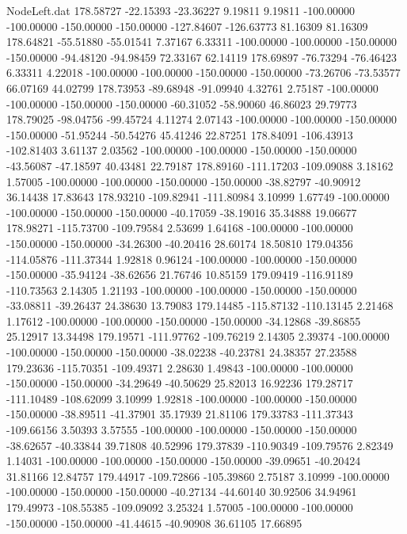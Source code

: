 \begin{filecontents}{NodeLeft.dat}
 178.58727  -22.15393  -23.36227     9.19811    9.19811 -100.00000 -100.00000 -150.00000 -150.00000 -127.84607 -126.63773   81.16309   81.16309
 178.64821  -55.51880  -55.01541     7.37167    6.33311 -100.00000 -100.00000 -150.00000 -150.00000  -94.48120  -94.98459   72.33167   62.14119
 178.69897  -76.73294  -76.46423     6.33311    4.22018 -100.00000 -100.00000 -150.00000 -150.00000  -73.26706  -73.53577   66.07169   44.02799
 178.73953  -89.68948  -91.09940     4.32761    2.75187 -100.00000 -100.00000 -150.00000 -150.00000  -60.31052  -58.90060   46.86023   29.79773
 178.79025  -98.04756  -99.45724     4.11274    2.07143 -100.00000 -100.00000 -150.00000 -150.00000  -51.95244  -50.54276   45.41246   22.87251
 178.84091 -106.43913 -102.81403     3.61137    2.03562 -100.00000 -100.00000 -150.00000 -150.00000  -43.56087  -47.18597   40.43481   22.79187
 178.89160 -111.17203 -109.09088     3.18162    1.57005 -100.00000 -100.00000 -150.00000 -150.00000  -38.82797  -40.90912   36.14438   17.83643
 178.93210 -109.82941 -111.80984     3.10999    1.67749 -100.00000 -100.00000 -150.00000 -150.00000  -40.17059  -38.19016   35.34888   19.06677
 178.98271 -115.73700 -109.79584     2.53699    1.64168 -100.00000 -100.00000 -150.00000 -150.00000  -34.26300  -40.20416   28.60174   18.50810
 179.04356 -114.05876 -111.37344     1.92818    0.96124 -100.00000 -100.00000 -150.00000 -150.00000  -35.94124  -38.62656   21.76746   10.85159
 179.09419 -116.91189 -110.73563     2.14305    1.21193 -100.00000 -100.00000 -150.00000 -150.00000  -33.08811  -39.26437   24.38630   13.79083
 179.14485 -115.87132 -110.13145     2.21468    1.17612 -100.00000 -100.00000 -150.00000 -150.00000  -34.12868  -39.86855   25.12917   13.34498
 179.19571 -111.97762 -109.76219     2.14305    2.39374 -100.00000 -100.00000 -150.00000 -150.00000  -38.02238  -40.23781   24.38357   27.23588
 179.23636 -115.70351 -109.49371     2.28630    1.49843 -100.00000 -100.00000 -150.00000 -150.00000  -34.29649  -40.50629   25.82013   16.92236
 179.28717 -111.10489 -108.62099     3.10999    1.92818 -100.00000 -100.00000 -150.00000 -150.00000  -38.89511  -41.37901   35.17939   21.81106
 179.33783 -111.37343 -109.66156     3.50393    3.57555 -100.00000 -100.00000 -150.00000 -150.00000  -38.62657  -40.33844   39.71808   40.52996
 179.37839 -110.90349 -109.79576     2.82349    1.14031 -100.00000 -100.00000 -150.00000 -150.00000  -39.09651  -40.20424   31.81166   12.84757
 179.44917 -109.72866 -105.39860     2.75187    3.10999 -100.00000 -100.00000 -150.00000 -150.00000  -40.27134  -44.60140   30.92506   34.94961
 179.49973 -108.55385 -109.09092     3.25324    1.57005 -100.00000 -100.00000 -150.00000 -150.00000  -41.44615  -40.90908   36.61105   17.66895

\end{filecontents}
